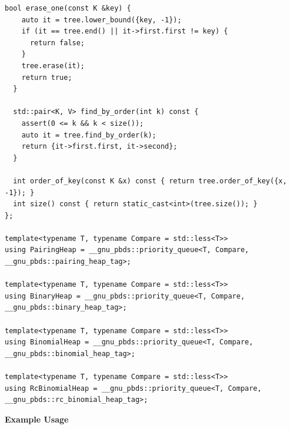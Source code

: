 \begin{lstlisting}[style=cpp]
  bool erase_one(const K &key) {
    auto it = tree.lower_bound({key, -1});
    if (it == tree.end() || it->first.first != key) {
      return false;
    }
    tree.erase(it);
    return true;
  }

  std::pair<K, V> find_by_order(int k) const {
    assert(0 <= k && k < size());
    auto it = tree.find_by_order(k);
    return {it->first.first, it->second};
  }

  int order_of_key(const K &x) const { return tree.order_of_key({x, -1}); }
  int size() const { return static_cast<int>(tree.size()); }
};

template<typename T, typename Compare = std::less<T>>
using PairingHeap = __gnu_pbds::priority_queue<T, Compare, __gnu_pbds::pairing_heap_tag>;

template<typename T, typename Compare = std::less<T>>
using BinaryHeap = __gnu_pbds::priority_queue<T, Compare, __gnu_pbds::binary_heap_tag>;

template<typename T, typename Compare = std::less<T>>
using BinomialHeap = __gnu_pbds::priority_queue<T, Compare, __gnu_pbds::binomial_heap_tag>;

template<typename T, typename Compare = std::less<T>>
using RcBinomialHeap = __gnu_pbds::priority_queue<T, Compare, __gnu_pbds::rc_binomial_heap_tag>;
\end{lstlisting}
\textbf{Example Usage}\par
